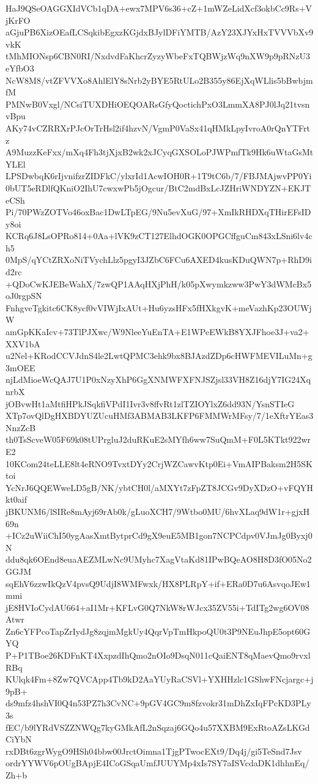 HaJ9QSeOAGGXIdVCb1qDA+ewx7MPV6s36+cZ+1mWZeLidXcf3okbCc9Rs+VjKrFO
aGjuPB6XizOEafLCSqkibEgxzKGjdxBJylDFiYMTB/AzY23XJYxHxTVVVbXv9vkK
tMhMIONsp6CBN0RI/NxdvdFaKhcrZyzyWbeFxTQBWjzWq9nXW9p9pRNzU3eYfbO3
NcW8M8/vtZFVVXo8AhlElY8sNrb2yBYE5RtULo2B355y86EjXqWLlis5bBwbjmfM
PMNwB0Vxgl/NCsiTUXDHiOEQOARsGfyQoctichPxO3LmmXA8PJ0lJq21tvsnvBpu
AKy74vCZRRXrPJcOrTrHsl2if4hzvN/VgmP0VaSx41qHMkLpyIvroA0rQnYTFrtz
A9MuzzKeFxx/mXq4Fh3tjXjxB2wk2xJCyqGXSOLoPJWPmfTk9Hk6uWtaGsMtYLEl
LPSDwbqK6rIjvnifzrZIDFkC/ylxrId1AcwIOH0R+1T9tC6b/7/FBJMAjwvPP0Yi
0bUT5eRDlfQKniO2IhU7cwxwPb5jOgcur/BtC2mdBxLcJZHriWNDYZN+EKJTeCSh
Pi/70PWzZOTVo46oxBac1DwLTpEG/9Nu5evXuG/97+XmIkRHDXqTHirEFsIDy8oi
KCRq6J8LsOPRo814+0Aa+lVK9zCT127ElhdOGK0OPGCffguCm843xLSni6lv4ch5
0MpS/qYCtZRXoNiTVychLlz5pgyI3JZbC6FCu6AXED4kusKDuQWN7p+RhD9id2rc
+QDoCwKJEBeWahX/7zwQP1AAqHXjPhH/k05pXwymkzww3PwY3dWMcBx5oJ0rgpSN
FnhgveTgkitc6CK8ycf0vVIWjIxAUt+Hu6yzsHFx5fHXkgvK+meVazhKp23OUWjW
amGpKKaIcv+73TlPJXwc/W9NleeYuEnTA+E1WPeEWkB8YXJFhoe3J+va2+XXV1bA
u2Nel+KRodCCVJdnS4le2LwtQPMC3ehk9bx8BJAzdZDp6cHWFMEVILuMn+g3mOEE
njLdMioeWcQAJ7U1P0xNzyXhP6GgXNMWFXFNJSZjsl33VH8Z16djY7IG24XqnrbX
jOBvwHt1aMtfiHPkJSqkfiVPdI1Ivr3v8ffvRt1zlTZIOYlxZ6dd93N/YsnSTIeG
XTp7ovQlDgHXBDYUZUcuHMf3ABMAB3LKFP6FMMWrMFsy/7/1eXftrYEas3NnzZcB
th0TsScveW05F69k08tUPrgluJ2duRKuE2sMYfh6ww7SuQmM+F0L5KTkt922wrE2
10KCom24teLLE8lt4eRNO9TvxtDYy2CrjWZCawvKtp0Ei+VmAIPBaksm2H5SKtoi
YcNrJ6QQEWweLD5gB/NK/ybtCH0l/aMXYt7zFpZT8JCGv9DyXDzO+vFQYHkt0aif
jBKUNM6/lSIRe8mAyj69rAb0k/gLuoXCH7/9Wtbo0MU/6hvXLaq9dW1r+gjxH69n
+ICz2uWiiChI50ygAasXmtBytprCd9gX9euE5MB1gon7NCPCdpv0VJmJg0Byxj0N
ddu8qk6OEnd8euaAEZMLwNc9UMyhc7XagVtaKd81IPwBQeAO8H8D3fO05No2GGJM
sqEhV6zzwIkQzV4pvsQ9UdjI8WMFwxk/HX8PLRpY+if+ERa0D7u6AsvqoJEw1mmi
jE8HVIoCydAU664+aI1Mr+KFLvG0Q7NkW8rWJcx35ZV55i+TdITg2wg6OV08Atwr
Zn6cYFPcoTapZrIydJg8zqjmMgkUy4QqrVpTmHkpoQU0t3P9NEuJhpE5opt60GYQ
P+P1TBoe26KDFnKT4XxpzdIhQmo2nOIo9DsqN011cQaiENT8qMaevQmo9rvxlRBq
KUlqk4Fm+8Zw7QVCApp4Tb9kD2AaYUyRaCSVl+YXHHzlc1GShwFNcjargc+j9pB+
ds9mfz4hshVI0Q4n53PZ7h3CvNC+9pGV4GC9m8fzvokr31mDhZxIqFPcKD3PLy3s
fEC/b9lYRdVSZZNWQg7kyGMkAfL2nSqzaj6GQo4u57XXBM9ExRtoAZsLKGdCiYbN
rxDBt6zgrWygO9HSh04bbw00JrctOimna1TjgPTwocEXt9/Dq4j/gi5TeSnd7Jsv
ordrYYWV6pOUgBApjE4ICoGSqaUmfJUUYMp4xIs7SY7aISVcdaDK1dhhnEq/Zh+b
